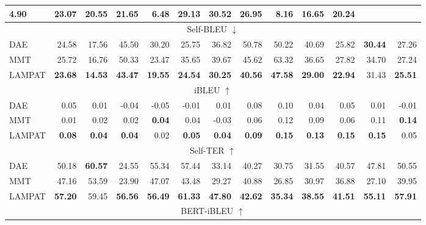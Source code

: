 \documentclass[letterpaper]{article} %
\begin{document}
\begin{table}[h!]
{\begin{tabular}{|lrrrrrrrrrrrr|}
  \textbf{4.90} &
  \textbf{23.07} &
  \textbf{20.55} &
  \textbf{21.65} &
  \textbf{6.48} &
  \textbf{29.13} &
  30.52 &
  \textbf{26.95} &
  \textbf{8.16} &
  \textbf{16.65} &
  \textbf{20.24} \\ \hline
\multicolumn{13}{|c|}{Self-BLEU $\downarrow$} \\ \hline
\multicolumn{1}{|l|}{DAE} &
  24.58 &
  17.56 &
  45.50 &
  30.20 &
  25.75 &
  36.82 &
  50.78 &
  50.22 &
  40.69 &
  25.82 &
  \textbf{30.44} &
  27.26 \\
\multicolumn{1}{|l|}{MMT} &
  25.72 &
  16.76 &
  50.33 &
  23.47 &
  35.65 &
  39.67 &
  45.62 &
  63.32 &
  36.65 &
  27.82 &
  34.70 &
  27.24 \\
\multicolumn{1}{|l|}{LAMPAT} &
  \textbf{23.68} &
  \textbf{14.53} &
  \textbf{43.47} &
  \textbf{19.55} &
  \textbf{24.54} &
  \textbf{30.25} &
  \textbf{40.56} &
  \textbf{47.58} &
  \textbf{29.00} &
  \textbf{22.94} &
  31.43 &
  \textbf{25.51} \\ \hline
\multicolumn{13}{|c|}{iBLEU $\uparrow$} \\ \hline
\multicolumn{1}{|l|}{DAE} &
  0.05 &
  0.01 &
  -0.04 &
  -0.05 &
  -0.01 &
  0.01 &
  0.08 &
  0.10 &
  0.04 &
  0.05 &
  0.01 &
  -0.01 \\
\multicolumn{1}{|l|}{MMT} &
  0.01 &
  0.02 &
  0.02 &
  \textbf{0.04} &
  0.04 &
  -0.03 &
  0.06 &
  0.12 &
  0.09 &
  0.06 &
  0.11 &
  \textbf{0.14} \\
\multicolumn{1}{|l|}{LAMPAT} &
  \textbf{0.08} &
  \textbf{0.04} &
  \textbf{0.04} &
  0.02 &
  \textbf{0.05} &
  \textbf{0.04} &
  \textbf{0.09} &
  \textbf{0.15} &
  \textbf{0.13} &
  \textbf{0.15} &
  \textbf{0.15} &
  0.05 \\ \hline
\multicolumn{13}{|c|}{Self-TER $\uparrow$} \\ \hline
\multicolumn{1}{|l|}{DAE} &
  50.18 &
  \textbf{60.57} &
  24.55 &
  55.34 &
  57.44 &
  33.14 &
  40.27 &
  30.75 &
  31.55 &
  40.57 &
  47.81 &
  50.55 \\
\multicolumn{1}{|l|}{MMT} &
  47.16 &
  53.59 &
  23.90 &
  47.07 &
  43.48 &
  29.27 &
  40.88 &
  26.85 &
  30.97 &
  36.88 &
  27.10 &
  39.95 \\
\multicolumn{1}{|l|}{LAMPAT} &
  \textbf{57.20} &
  59.45 &
  \textbf{56.56}&
  \textbf{56.49} &
  \textbf{61.33} &
  \textbf{47.80} &
  \textbf{42.62}&
  \textbf{35.34} &
  \textbf{38.55} &
  \textbf{41.51} &
  \textbf{55.11} &
  \textbf{57.91} \\ \hline
\multicolumn{13}{|c|}{BERT-iBLEU $\uparrow$} \\ \hline

\end{tabular}}
\end{table}
\end{document}
